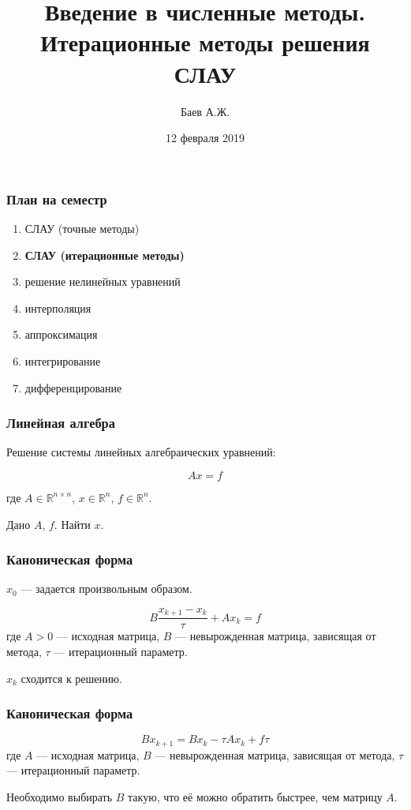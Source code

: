 \documentclass[10pt]{beamer}
\author{Баев А.Ж.}
\title{Введение в численные методы. \\ Итерационные методы решения СЛАУ}
\institute{Казахстанский филиал МГУ}
\date{12 февраля 2019}
\begin{document}
\maketitle


\begin{frame}[fragile]
\frametitle{План на семестр}

\begin{enumerate}
\item СЛАУ (точные методы)
\item \textbf{СЛАУ (итерационные методы)}
\item решение нелинейных уравнений
\item интерполяция 
\item аппроксимация
\item интегрирование
\item дифференцирование
\end{enumerate}

\end{frame}


\begin{frame}[fragile]
\frametitle{Линейная алгебра}

Решение системы линейных алгебраических уравнений:

$$A x = f$$

где $A \in \mathbb{R}^{n \times n}$, $x \in \mathbb{R}^{n}$, $f \in \mathbb{R}^{n}$.

Дано $A$, $f$. Найти $x$.

\end{frame}


\begin{frame}[fragile]
\frametitle{Каноническая форма}

\vfill
$x_0$ --- задается произвольным образом.

\vfill
$$ B \frac{x_{k+1} - x_k}{\tau} + A x_k = f$$
где $A > 0$ --- исходная матрица, $B$ --- невырожденная матрица, зависящая от метода, $\tau$ --- итерационный параметр.

\vfill
$x_k$ сходится к решению.

\vfill

\end{frame}

\begin{frame}[fragile]
\frametitle{Каноническая форма}

$$ B x_{k+1} = B x_k - \tau A x_k + f \tau$$
где $A$ --- исходная матрица, $B$ --- невырожденная матрица, зависящая от метода, $\tau$ --- итерационный параметр.

\vfill

Необходимо выбирать $B$ такую, что её можно обратить быстрее, чем матрицу $A$.

\end{frame}
\end{document}

